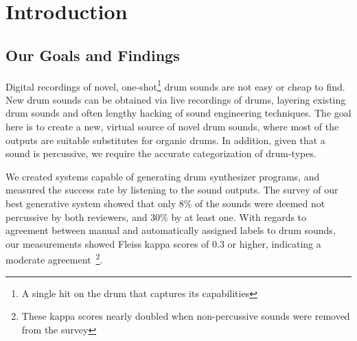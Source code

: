 \documentclass[\main/thesis.tex]{subfiles}
\begin{document}
\chapter{Introduction}

 
\section{Our Goals and Findings}
Digital recordings of novel, one-shot\footnote{A single hit on the drum that captures its capabilities} drum sounds are not easy or cheap to find. New drum sounds can be obtained via live recordings of drums, layering existing drum sounds and often lengthy hacking of sound engineering techniques. The goal here is to create a new, virtual source of novel drum sounds, where most of the outputs are suitable substitutes for organic drums. In addition, given that a sound is percussive, we require the accurate categorization of drum-types.

We created systems capable of generating drum synthesizer programs, and measured the success rate by listening to the sound outputs. The survey of our best generative system showed that only 8\% of the sounds were deemed not percussive by both reviewers, and 30\% by at least one. With regards to agreement between manual and automatically assigned labels to drum sounds, our measurements showed Fleiss kappa scores of 0.3 or higher, indicating a moderate agreement~\footnote{These kappa scores nearly doubled when non-percussive sounds were removed from the survey}.


\end{document}
